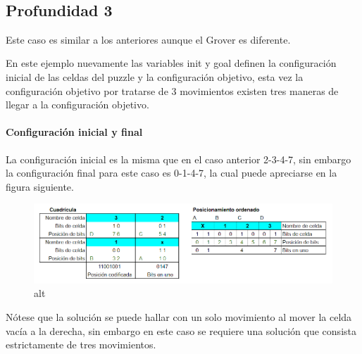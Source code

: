 \documentclass[11pt]{article}
\newcommand{\prompt}[4]{
        {\ttfamily\llap{{\color{#2}[#3]:\hspace{3pt}#4}}\vspace{-\baselineskip}}
    }
\begin{document}
            
\prompt{Out}{outcolor}{5}{}
    
    \begin{center}
    \end{center}
    { \hspace*{\fill} \\}
    

    \hypertarget{profundidad-3}{%
\subsection{Profundidad 3}\label{profundidad-3}}

Este caso es similar a los anteriores aunque el Grover es diferente.

En este ejemplo nuevamente las variables init y goal definen la
configuración inicial de las celdas del puzzle y la configuración
objetivo, esta vez la configuración objetivo por tratarse de 3
movimientos existen tres maneras de llegar a la configuración objetivo.

\hypertarget{configuraciuxf3n-inicial-y-final}{%
\paragraph{Configuración inicial y
final}\label{configuraciuxf3n-inicial-y-final}}

La configuración inicial es la misma que en el caso anterior 2-3-4-7,
sin embargo la configuración final para este caso es 0-1-4-7, la cual
puede apreciarse en la figura siguiente.

\begin{figure}
\centering
\includegraphics{Posicion-final2.png}
\caption{alt}
\end{figure}

Nótese que la solución se puede hallar con un solo movimiento al mover
la celda vacía a la derecha, sin embargo en este caso se requiere una
solución que consista estrictamente de tres movimientos.
\end{document}
